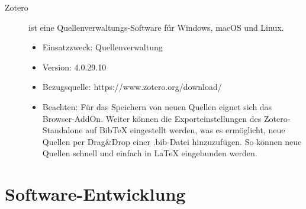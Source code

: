 \begin{description}
	
	\item [Zotero] ist eine Quellenverwaltungs-Software für Windows, macOS und Linux.
	\begin{itemize}
		\item Einsatzzweck: Quellenverwaltung
		\item Version: 4.0.29.10
		\item Bezugsquelle: https://www.zotero.org/download/
		\item Beachten: Für das Speichern von neuen Quellen eignet sich das Browser-AddOn. Weiter können die Exporteinstellungen des Zotero-Standalone auf BibTeX eingestellt werden, was es ermöglicht, neue Quellen per Drag\&Drop einer .bib-Datei hinzuzufügen. So können neue Quellen schnell und einfach in LaTeX eingebunden werden.
	\end{itemize}
\end{description}



\section{Software-Entwicklung}

